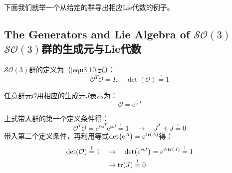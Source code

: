 下面我们就举一个从给定的群导出相应Lie代数的例子。

\subsection[$\mathcal{SO}(3)$群的生成元与Lie代数]{The Generators and Lie Algebra of $\mathcal{SO}(3)$\quad $\mathcal{SO}(3)$群的生成元与Lie代数}
\label{sec3.4.1}
$\mathcal{SO}(3)$群的定义为（\eqref{equ3.10}式）：
\begin{equation}
\label{equ3.58}
\mathcal{O}^T \mathcal{O} \stackrel{!}{=} I , \quad \det(\mathcal{O}) \stackrel{!}{=} 1
\end{equation}

任意群元$\mathcal{O}$用相应的生成元$J$表示为：
\begin{equation}
\label{equ3.59}
\mathcal{O} = \mathrm{e}^{\phi J} %
\end{equation}

上式带入群的第一个定义条件得：
\begin{equation}
\label{equ3.60}
\mathcal{O}^T \mathcal{O} = \mathrm{e}^{\phi J^T} \mathrm{e}^{\phi J} \stackrel{!}{=} 1 \quad \rightarrow \quad J^T + J \stackrel{!}{=} 0
\end{equation}
带入第二个定义条件，再利用等式$\det(\mathrm{e}^A) = \mathrm{e}^{\tr(A)}$得：
\begin{align}
\det(\mathcal{O}) \stackrel{!}{=} 1 \quad &\rightarrow \quad \det(\mathrm{e}^{\phi J}) = \mathrm{e}^{\phi \tr (J)} \stackrel{!}{=} 1
\nonumber \\
\label{equ3.61}
& \rightarrow \tr(J) \stackrel{!}{=} 0
\end{align}

